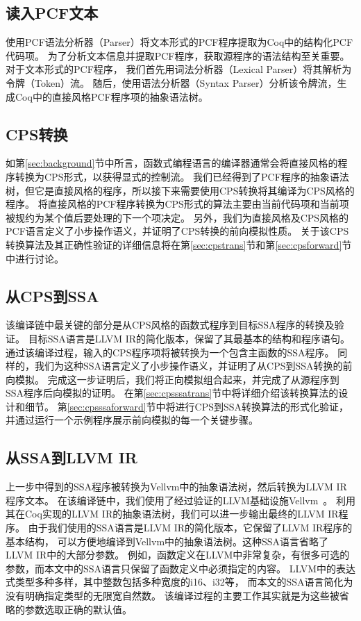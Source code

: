 \subsection{读入PCF文本}

使用PCF语法分析器（Parser）将文本形式的PCF程序提取为Coq中的结构化PCF代码项。
为了分析文本信息并提取PCF程序，获取源程序的语法结构至关重要。对于文本形式的PCF程序，
我们首先用词法分析器（Lexical Parser）将其解析为令牌（Token）流。
随后，使用语法分析器（Syntax Parser）分析该令牌流，生成Coq中的直接风格PCF程序项的抽象语法树。

\subsection{CPS转换}

如第\ref{sec:background}节中所言，函数式编程语言的编译器通常会将直接风格的程序转换为CPS形式，以获得显式的控制流。
我们已经得到了PCF程序的抽象语法树，但它是直接风格的程序，所以接下来需要使用CPS转换将其编译为CPS风格的程序。
将直接风格的PCF程序转换为CPS形式的算法主要由当前代码项和当前项被规约为某个值后要处理的下一个项决定。
另外，我们为直接风格及CPS风格的PCF语言定义了小步操作语义，并证明了CPS转换的前向模拟性质。
关于该CPS转换算法及其正确性验证的详细信息将在第\ref{sec:cpstrans}节和第\ref{sec:cpsforward}节中进行讨论。

\subsection{从CPS到SSA}

该编译链中最关键的部分是从CPS风格的函数式程序到目标SSA程序的转换及验证。
目标SSA语言是LLVM IR的简化版本，保留了其最基本的结构和程序语句。
通过该编译过程，输入的CPS程序项将被转换为一个包含主函数的SSA程序。
同样的，我们为这种SSA语言定义了小步操作语义，并证明了从CPS到SSA转换的前向模拟。
完成这一步证明后，我们将正向模拟组合起来，并完成了从源程序到SSA程序后向模拟的证明。
在第\ref{sec:cpsssatrans}节中将详细介绍该转换算法的设计和细节。
第\ref{sec:cpsssaforward}节中将进行CPS到SSA转换算法的形式化验证，并通过运行一个示例程序展示前向模拟的每一个关键步骤。

\subsection{从SSA到LLVM IR}

上一步中得到的SSA程序被转换为Vellvm中的抽象语法树，然后转换为LLVM IR程序文本。
在该编译链中，我们使用了经过验证的LLVM基础设施Vellvm~\cite{zakowski2021modular}。
利用其在Coq实现的LLVM IR的抽象语法树，我们可以进一步输出最终的LLVM IR程序。
由于我们使用的SSA语言是LLVM IR的简化版本，它保留了LLVM IR程序的基本结构，
可以方便地编译到Vellvm中的抽象语法树。这种SSA语言省略了LLVM IR中的大部分参数。
例如，函数定义在LLVM中非常复杂，有很多可选的参数，而本文中的SSA语言只保留了函数定义中必须指定的内容。
LLVM中的表达式类型多种多样，其中整数包括多种宽度的i16、i32等，
而本文的SSA语言简化为没有明确指定类型的无限宽自然数。
该编译过程的主要工作其实就是为这些被省略的参数选取正确的默认值。

